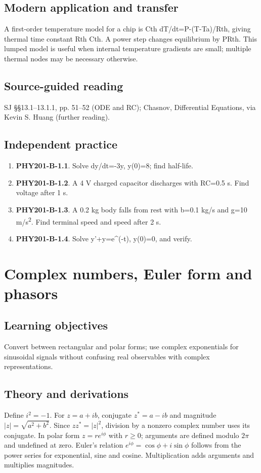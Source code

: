 \documentclass[11pt,a4paper,openany]{book}
\begin{document}
\section{Modern application and transfer}
A first-order temperature model for a chip is Cth dT/dt=P-(T-Ta)/Rth, giving thermal time constant Rth Cth. A power step changes equilibrium by PRth. This lumped model is useful when internal temperature gradients are small; multiple thermal nodes may be necessary otherwise.
\section{Source-guided reading}
SJ §§13.1–13.1.1, pp. 51–52 (ODE and RC); Chasnov, Differential Equations, via Kevin S. Huang (further reading).
\section{Independent practice}
\begin{enumerate}
\item \textbf{PHY201-B-1.1}. Solve dy/dt=-3y, y(0)=8; find half-life.
\item \textbf{PHY201-B-1.2}. A 4 V charged capacitor discharges with RC=0.5 s. Find voltage after 1 s.
\item \textbf{PHY201-B-1.3}. A 0.2 kg body falls from rest with b=0.1 kg/s and g=10 m/s\textsuperscript{2}. Find terminal speed and speed after 2 s.
\item \textbf{PHY201-B-1.4}. Solve y'+y=e^(-t), y(0)=0, and verify.
\end{enumerate}
\chapter{Complex numbers, Euler form and phasors}
\section{Learning objectives}
Convert between rectangular and polar forms; use complex exponentials for sinusoidal signals without confusing real observables with complex representations.
\section{Theory and derivations}
Define $i^2=-1$. For $z=a+ib$, conjugate $z^*=a-ib$ and magnitude $|z|=\sqrt{a^2+b^2}$. Since $zz^*=|z|^2$, division by a nonzero complex number uses its conjugate. In polar form $z=re^{i\phi}$ with $r\ge0$; arguments are defined modulo $2\pi$ and undefined at zero. Euler's relation $e^{i\phi}=\cos\phi+i\sin\phi$ follows from the power series for exponential, sine and cosine. Multiplication adds arguments and multiplies magnitudes.
\end{document}
